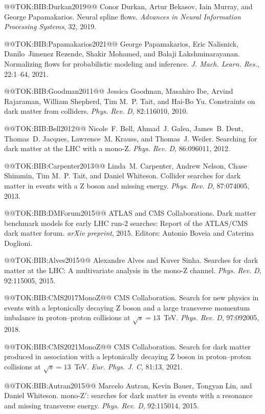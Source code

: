 \documentclass{article}
\begin{document}
@@TOK:BIB:Durkan2019@@ Conor Durkan, Artur Bekasov, Iain Murray, and George Papamakarios.
  Neural spline flows.
  {\em Advances in Neural Information Processing Systems}, 32, 2019.

@@TOK:BIB:Papamakarios2021@@ George Papamakarios, Eric Nalisnick, Danilo~Jimenez Rezende, Shakir Mohamed,
  and Balaji Lakshminarayanan.
  Normalizing flows for probabilistic modeling and inference.
  {\em J. Mach. Learn. Res.}, 22:1--64, 2021.

@@TOK:BIB:Goodman2011@@ Jessica Goodman, Masahiro Ibe, Arvind Rajaraman, William Shepherd, Tim M.~P.
  Tait, and Hai-Bo Yu.
  Constraints on dark matter from colliders.
  {\em Phys. Rev. D}, 82:116010, 2010.

@@TOK:BIB:Bell2012@@ Nicole~F. Bell, Ahmad~J. Galea, James~B. Dent, Thomas~D. Jacques, Lawrence~M.
  Krauss, and Thomas~J. Weiler.
  Searching for dark matter at the {LHC} with a mono-{Z}.
  {\em Phys. Rev. D}, 86:096011, 2012.

@@TOK:BIB:Carpenter2013@@ Linda~M. Carpenter, Andrew Nelson, Chase Shimmin, Tim M.~P. Tait, and Daniel
  Whiteson.
  Collider searches for dark matter in events with a {Z} boson and
  missing energy.
  {\em Phys. Rev. D}, 87:074005, 2013.

@@TOK:BIB:DMForum2015@@ {ATLAS and CMS Collaborations}.
  Dark matter benchmark models for early {LHC} run-2 searches: Report
  of the {ATLAS/CMS} dark matter forum.
  {\em arXiv preprint}, 2015.
  Editors: Antonio Boveia and Caterina Doglioni.

@@TOK:BIB:Alves2015@@ Alexandre Alves and Kuver Sinha.
  Searches for dark matter at the {LHC}: A multivariate analysis in the
  mono-{Z} channel.
  {\em Phys. Rev. D}, 92:115005, 2015.

@@TOK:BIB:CMS2017MonoZ@@ {CMS Collaboration}.
  Search for new physics in events with a leptonically decaying {Z}
  boson and a large transverse momentum imbalance in proton--proton collisions
  at $\sqrt{s}=13$~{TeV}.
  {\em Phys. Rev. D}, 97:092005, 2018.

@@TOK:BIB:CMS2021MonoZ@@ {CMS Collaboration}.
  Search for dark matter produced in association with a leptonically
  decaying {Z} boson in proton--proton collisions at $\sqrt{s}=13$~{TeV}.
  {\em Eur. Phys. J. C}, 81:13, 2021.

@@TOK:BIB:Autran2015@@ Marcelo Autran, Kevin Bauer, Tongyan Lin, and Daniel Whiteson.
  mono-{Z}$'$: searches for dark matter in events with a resonance and
  missing transverse energy.
  {\em Phys. Rev. D}, 92:115014, 2015.
\end{document}
